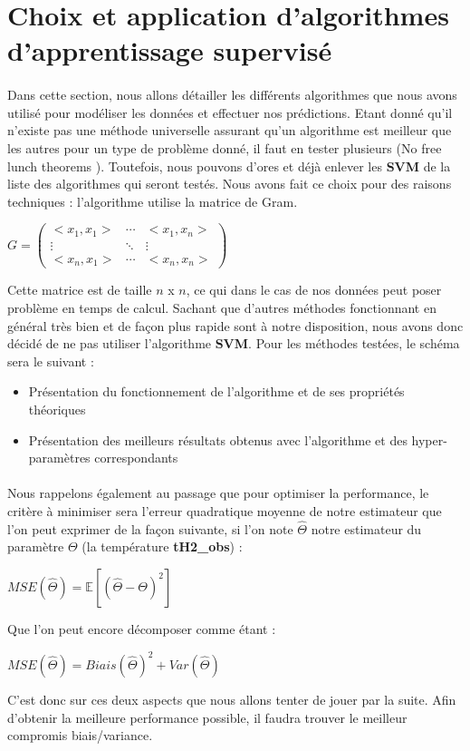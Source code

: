 \documentclass[14pt, openany]{article}
\begin{document}
\section{Choix et application d'algorithmes d'apprentissage supervisé}
\paragraph{}
Dans cette section, nous allons détailler les différents algorithmes que nous avons utilisé pour modéliser les données et effectuer nos prédictions. Etant donné qu'il n'existe pas une méthode universelle assurant qu'un algorithme est meilleur que les autres pour un type de problème donné, il faut en tester plusieurs (\og No free lunch theorems \fg{}). Toutefois, nous pouvons d'ores et déjà enlever les \textbf{SVM} de la liste des algorithmes qui seront testés. Nous avons fait ce choix pour des raisons techniques : l'algorithme utilise la matrice de Gram.
\begin{center}
$G = \begin{pmatrix} <x_1,x_1> & \cdots & <x_1,x_n> \\ \vdots & \ddots & \vdots \\ <x_n,x_1> & \cdots & <x_n,x_n> \end{pmatrix}$
\end{center}
Cette matrice est de taille $n$ x $n$, ce qui dans le cas de nos données peut poser problème en temps de calcul. Sachant que d'autres méthodes fonctionnant en général très bien et de façon plus rapide sont à notre disposition, nous avons donc décidé de ne pas utiliser l'algorithme \textbf{SVM}. Pour les méthodes testées, le schéma sera le suivant :
\begin{itemize}
\item Présentation du fonctionnement de l'algorithme et de ses propriétés théoriques
\item Présentation des meilleurs résultats obtenus avec l'algorithme et des hyper-paramètres correspondants
\end{itemize}
\paragraph{}
Nous rappelons également au passage que pour optimiser la performance, le critère à minimiser sera l'erreur quadratique moyenne de notre estimateur que l'on peut exprimer de la façon suivante, si l'on note $\hat{\Theta}$ notre estimateur du paramètre $\Theta$ (la température \textbf{tH2\_obs}) :
\begin{center}
$MSE(\hat{\Theta})=\mathbb{E}[(\hat{\Theta}-\Theta)^2]$
\end{center}
Que l'on peut encore décomposer comme étant :
\begin{center}
$MSE(\hat{\Theta})=Biais(\hat{\Theta})^2+Var(\hat{\Theta})$
\end{center}
C'est donc sur ces deux aspects que nous allons tenter de jouer par la suite. Afin d'obtenir la \og meilleure \fg{} performance possible, il faudra trouver le \og meilleur \fg{} compromis biais/variance.
\end{document}
